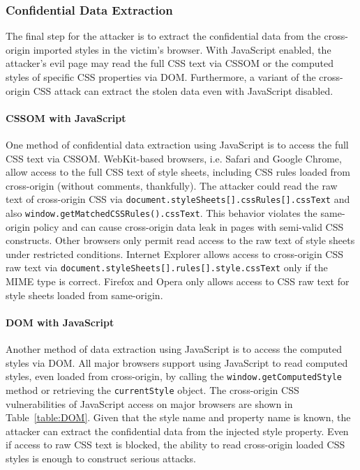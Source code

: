 \documentclass{acm_proc_article-sp}
\begin{document}
\subsubsection{Confidential Data Extraction}\label{sec:extraction}
The final step for the attacker is to extract the confidential data from the cross-origin imported styles in the victim's browser. With JavaScript enabled, the attacker's evil page may read the full CSS text via CSSOM or the computed styles of specific CSS properties via DOM. Furthermore, a variant of the cross-origin CSS attack can extract the stolen data even with JavaScript disabled. 

\paragraph{CSSOM with JavaScript}
One method of confidential data extraction using JavaScript is to access the full CSS text via CSSOM. WebKit-based browsers, i.e. Safari and Google Chrome, allow access to the full CSS text of style sheets, including CSS rules loaded from cross-origin (without comments, thankfully). The attacker could read the raw text of cross-origin CSS via \texttt{document.styleSheets[].cssRules[].cssText} and also \texttt{window.getMatchedCSSRules().cssText}. This behavior violates the same-origin policy and can cause cross-origin data leak in pages with semi-valid CSS constructs. Other browsers only permit read access to the raw text of style sheets under restricted conditions. Internet Explorer allows access to cross-origin CSS raw text via \texttt{document.styleSheets[].rules[].style.cssText} only if the MIME type is correct. Firefox and Opera only allows access to CSS raw text for style sheets loaded from same-origin.

\paragraph{DOM with JavaScript}
Another method of data extraction using JavaScript is to access the computed styles via DOM. All major browsers support using JavaScript to read computed styles, even loaded from cross-origin, by calling the \texttt{window.getComputedStyle} method or retrieving the \texttt{currentStyle} object. The cross-origin CSS vulnerabilities of JavaScript access on major browsers are shown in Table~\ref{table:DOM}. Given that the style name and property name is known, the attacker can extract the confidential data from the injected style property. Even if access to raw CSS text is blocked, the ability to read cross-origin loaded CSS styles is enough to construct serious attacks.
\end{document}
